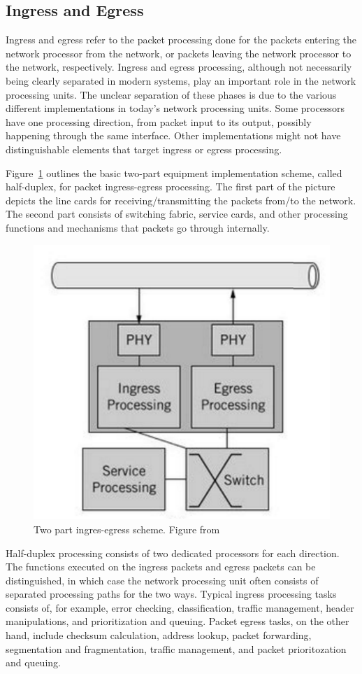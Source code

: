 \subsection{Ingress and Egress}
Ingress and egress refer to the packet processing done for the packets entering the network processor from the network, or packets leaving the network processor to the network, respectively. Ingress and egress processing, although not necessarily being clearly separated in modern systems, play an important role in the network processing units. The unclear separation of these phases is due to the various different implementations in today's network processing units. Some processors have one processing direction, from packet input to its output, possibly happening through the same interface. Other implementations might not have distinguishable elements that target ingress or egress processing.~\cite{Giladi:2008:Network}

Figure~\ref{fig:ingress-egress} outlines the basic two-part equipment implementation scheme, called half-duplex, for packet ingress-egress processing. The first part of the picture depicts the line cards for receiving/transmitting the packets from/to the network. The second part consists of switching fabric, service cards, and other processing functions and mechanisms that packets go through internally.

\begin{figure}[]
  \begin{center}
    \includegraphics[width=.6\textwidth]{images/ingress-egress.pdf}
    \caption{Two part ingres-egress scheme. Figure from~\cite{Giladi:2008:Network}}
    \label{fig:ingress-egress}
  \end{center}
\end{figure}

Half-duplex processing consists of two dedicated processors for each direction. The functions executed on the ingress packets and egress packets can be distinguished, in which case the network processing unit often consists of separated processing paths for the two ways. Typical ingress processing tasks consists of, for example, error checking, classification, traffic management, header manipulations, and prioritization and queuing. Packet egress tasks, on the other hand, include checksum calculation, address lookup, packet forwarding, segmentation and fragmentation, traffic management, and packet prioritozation and queuing.~\cite{Giladi:2008:Network}

